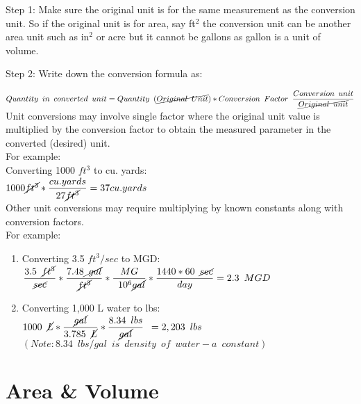 Step 1:  Make sure the original unit is for the same measurement as the conversion unit.  So if the original unit is for area, say ft$^2$ the conversion unit can be another area unit such as in$^2$ or acre but it cannot be gallons as gallon is a unit of volume.

Step 2: Write down the conversion formula as:

$Quantity \enspace in \enspace converted \enspace unit = Quantity \enspace (\cancel{Original \enspace Unit}) *   Conversion  \enspace Factor \enspace  \dfrac{Conversion \enspace unit}{\cancel{Original \enspace unit}}$\\
\hspace{0.2cm}
Unit conversions may involve single factor where the original unit value is multiplied by the conversion factor to obtain the measured parameter in the converted (desired) unit.\\
For example:\\  
Converting 1000 $ft^3$ to cu. yards:\\

$1000 \cancel{ft^3}*\dfrac{cu.yards}{27\cancel{ft^3}} = 37 cu.yards$\\

Other unit conversions may require multiplying by known constants along with conversion factors.\\
For example:\\
\begin{enumerate}  

\item Converting 3.5 $ft^3/sec$ to MGD:\\
$\dfrac{3.5 \enspace \cancel{ft^3}}{\cancel{sec}} * \dfrac{7.48\cancel {\enspace gal}}{\cancel{ft^3}} * \dfrac{MG}{\enspace 10^6 \cancel{gal}}* \dfrac{1440*60 \enspace \cancel{sec}}{day}=  2.3 \enspace MGD$\\

\item Converting 1,000 L water to lbs:\\
$1000 \enspace \cancel{L}*\dfrac {\cancel{gal}}{3.785 \enspace \cancel{L}}*\dfrac{8.34 \enspace lbs}{\cancel{gal}}\enspace  = 2,203 \enspace lbs$\\
$(Note:8.34 \enspace lbs/gal \enspace is \enspace density \enspace of \enspace water - a \enspace constant)$\\ 

\end{enumerate}

\section{Area \& Volume}

